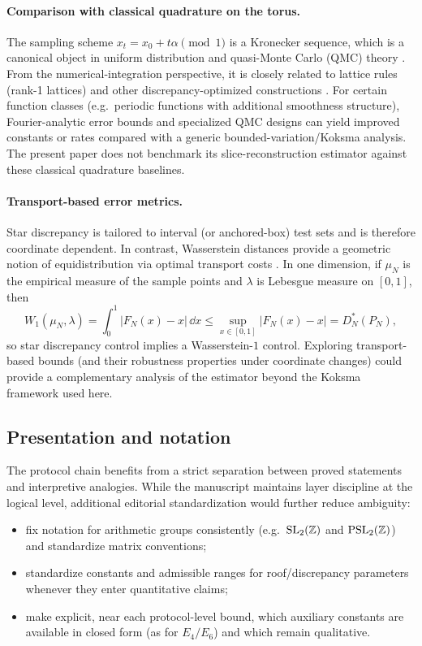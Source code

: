 \paragraph{Comparison with classical quadrature on the torus.}
The sampling scheme $x_t=x_0+t\alpha\pmod 1$ is a Kronecker sequence, which is a canonical object in uniform distribution and quasi-Monte Carlo (QMC) theory \cite{KuipersNiederreiter1974,DrmotaTichy1997,Niederreiter1992}.
From the numerical-integration perspective, it is closely related to lattice rules (rank-1 lattices) and other discrepancy-optimized constructions \cite{SloanJoe1994,DickPillichshammer2010}.
For certain function classes (e.g.\ periodic functions with additional smoothness structure), Fourier-analytic error bounds and specialized QMC designs can yield improved constants or rates compared with a generic bounded-variation/Koksma analysis.
The present paper does not benchmark its slice-reconstruction estimator against these classical quadrature baselines.

\paragraph{Transport-based error metrics.}
Star discrepancy is tailored to interval (or anchored-box) test sets and is therefore coordinate dependent.
In contrast, Wasserstein distances provide a geometric notion of equidistribution via optimal transport costs \cite{Villani2009,Santambrogio2015}.
In one dimension, if $\mu_N$ is the empirical measure of the sample points and $\lambda$ is Lebesgue measure on $[0,1]$, then
\[
W_1(\mu_N,\lambda)=\int_0^1 |F_N(x)-x|\,\dd x
\le \sup_{x\in[0,1]}|F_N(x)-x|
=D_N^\ast(P_N),
\]
so star discrepancy control implies a Wasserstein-$1$ control.
Exploring transport-based bounds (and their robustness properties under coordinate changes) could provide a complementary analysis of the estimator beyond the Koksma framework used here.

\subsection{Presentation and notation}
\label{app:limitations_presentation_notation}

The protocol chain benefits from a strict separation between proved statements and interpretive analogies.
While the manuscript maintains layer discipline at the logical level, additional editorial standardization would further reduce ambiguity:
\begin{itemize}
\item fix notation for arithmetic groups consistently (e.g.\ $\mathrm{SL}_2(\mathbb{Z})$ and $\mathrm{PSL}_2(\mathbb{Z})$) and standardize matrix conventions;
\item standardize constants and admissible ranges for roof/discrepancy parameters whenever they enter quantitative claims;
\item make explicit, near each protocol-level bound, which auxiliary constants are available in closed form (as for $E_4/E_6$) and which remain qualitative.
\end{itemize}


